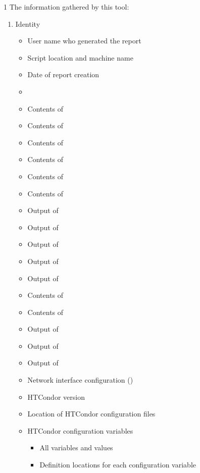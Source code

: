 \begin{ManPage}{\label{man-condor-gather-info}}{1}
The information gathered by this tool:
\begin{enumerate}
	\item Identity
	\begin{itemize}
          \item User name who generated the report
          \item Script location and machine name
          \item Date of report creation
          \item {}
          \item Contents of 
          \item Contents of 
          \item Contents of 
          \item Contents of 
          \item Contents of 
          \item Contents of 
          \item Output of 
          \item Output of 
          \item Output of 
          \item Output of 
          \item Output of 
          \item Contents of 
          \item Contents of 
          \item Output of 
          \item Output of 
          \item Output of 
          \item Network interface configuration ()
          \item HTCondor version
          \item Location of HTCondor configuration files
          \item HTCondor configuration variables
		  \begin{itemize}
                \item All variables and values
                \item Definition locations for each configuration variable 

\end{itemize}
\end{itemize}
\end{enumerate}
\end{ManPage}
